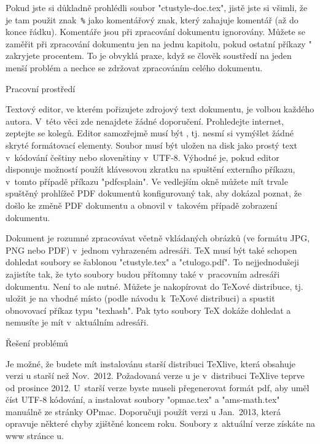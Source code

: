 Pokud jste si důkladně prohlédli soubor "ctustyle-doc.tex", jistě jste si všimli, že
je tam použit znak~{\tt\%} jako komentářový znak, který zahajuje komentář
(až do konce řádku). Komentáře jsou při zpracování dokumentu ignorovány. 
Můžete se zaměřit při zpracování dokumentu jen na jednu kapitolu, pokud ostatní
příkazy " zakryjete procentem. To je obvyklá praxe, když se
člověk soustředí na jeden menší problém a nechce se zdržovat zpracováním
celého dokumentu.


\sec Pracovní prostředí

Textový editor, ve kterém pořizujete zdrojový text dokumentu, je volbou
každého autora. V~této věci zde nenajdete žádné doporučení. Prohledejte
internet, zeptejte se kolegů. Editor samozřejmě musí být , tj. nesmí si vymýšlet žádné skryté formátovací elementy. Soubor
musí být uložen na disk jako prostý text v~kódování češtiny nebo slovenštiny 
v~UTF-8. Výhodné je, pokud editor disponuje možností použít klávesovou zkratku
na spuštění externího příkazu, v~tomto případě příkazu 
"pdfcsplain". Ve vedlejším okně můžete mít trvale spuštěný prohlížeč PDF
dokumentů konfigurovaný tak, aby dokázal poznat, že došlo ke
změně PDF dokumentu a obnovil v~takovém případě zobrazení dokumentu.

Dokument je rozumné zpracovávat včetně vkládaných obrázků (ve formátu JPG,
PNG nebo PDF) v~jednom vyhrazeném adresáři. \TeX{} musí být také schopen
dohledat soubory se šablonou "ctustyle.tex" a "ctulogo.pdf". To
nejjednodušeji zajistíte tak, že tyto soubory budou přítomny také
v~pracovním adresáři dokumentu. Není to ale nutné. Můžete je nakopírovat do
\TeX{}ové distribuce, tj. uložit je na vhodné místo (podle návodu k~\TeX{}ové
distribuci) a spustit obnovovací příkaz typu "texhash". Pak tyto soubory
\TeX{} dokáže dohledat a nemusíte je mít v~aktuálním adresáři.


\sec Řešení problémů

Je možné, že budete mít instalovánu starší distribuci \TeX{}live, která
obsahuje verzi \csplain{}u starší než Nov.~2012. Požadovaná verze
\csplain{}u je v~distribuci \TeX{}live teprve od prosince 2012. U~starší
verze byste museli přegenerovat formát pdf\csplain, aby uměl číst UTF-8
kódování, a instalovat soubory "opmac.tex" a "ams-math.tex" manuálně ze
stránky OPmac. 
Doporučuji použít verzi \csplain{}u Jan.~2013, která
opravuje některé chyby zjištěné koncem roku. Soubory z~aktuální verze
získáte na www stránce 
\csplain{}u.

